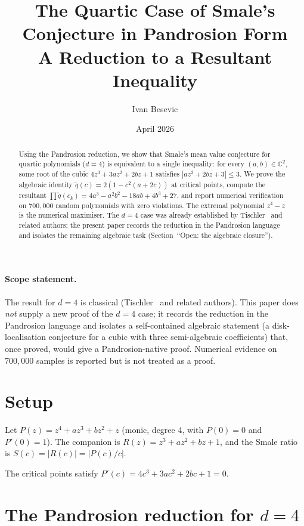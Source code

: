 \documentclass[11pt,a4paper]{article}
\title{The Quartic Case of Smale's Conjecture in Pandrosion Form \\ A Reduction to a Resultant Inequality}
\author{Ivan Besevic}
\date{April 2026}
\begin{document}
\maketitle

\begin{abstract}
Using the Pandrosion reduction, we show that Smale's mean value conjecture for quartic polynomials ($d = 4$) is equivalent to a single inequality: for every $(a, b) \in \mathbb{C}^2$, some root of the cubic $4z^3 + 3az^2 + 2bz + 1$ satisfies $|az^2 + 2bz + 3| \le 3$. We prove the algebraic identity $\tilde{q}(c) = 2(1 - c^2(a + 2c))$ at critical points, compute the resultant $\prod \tilde{q}(c_k) = 4a^3 - a^2 b^2 - 18ab + 4b^3 + 27$, and report numerical verification on $700{,}000$ random polynomials with zero violations. The extremal polynomial $z^4 - z$ is the numerical maximiser. The $d = 4$ case was already established by Tischler~\cite{tischler} and related authors; the present paper records the reduction in the Pandrosion language and isolates the remaining algebraic task (Section~``Open: the algebraic closure'').
\end{abstract}

\paragraph{Scope statement.} The result for $d = 4$ is classical (Tischler~\cite{tischler} and related authors). This paper does \emph{not} supply a new proof of the $d = 4$ case; it records the reduction in the Pandrosion language and isolates a self-contained algebraic statement (a disk-localisation conjecture for a cubic with three semi-algebraic coefficients) that, once proved, would give a Pandrosion-native proof. Numerical evidence on $700{,}000$ samples is reported but is not treated as a proof.

\section{Setup}

Let $P(z) = z^4 + az^3 + bz^2 + z$ (monic, degree 4, with $P(0) = 0$ and $P'(0) = 1$). The companion is $R(z) = z^3 + az^2 + bz + 1$, and the Smale ratio is $S(c) = |R(c)| = |P(c)/c|$.

The critical points satisfy $P'(c) = 4c^3 + 3ac^2 + 2bc + 1 = 0$.

\section{The Pandrosion reduction for $d = 4$}
\end{document}
